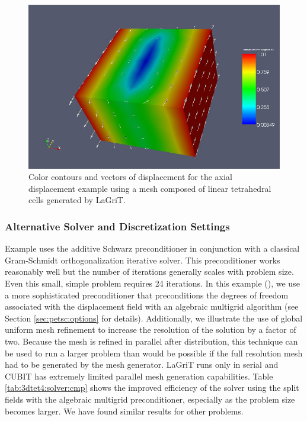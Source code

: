 \begin{figure}
  \includegraphics[scale=0.45]{examples/figs/3dtet4_shear}
  \caption{Color contours and vectors of displacement for the axial displacement
    example using a mesh composed of linear tetrahedral cells generated
    by LaGriT.}
  \label{fig:3dtet4:shear}
\end{figure}


\subsubsection{Alternative Solver and Discretization Settings}

Example  uses the additive Schwarz preconditioner
in conjunction with a classical Gram-Schmidt orthogonalization iterative
solver. This preconditioner works reasonably well but the number of
iterations generally scales with problem size. Even this small, simple
problem requires 24 iterations. In this example (),
we use a more sophisticated preconditioner that preconditions the
degrees of freedom associated with the displacement field with an
algebraic multigrid algorithm (see Section \vref{sec:petsc:options}
for details). Additionally, we illustrate the use of global uniform
mesh refinement to increase the resolution of the solution by a factor
of two. Because the mesh is refined in parallel after distribution,
this technique can be used to run a larger problem than would be possible
if the full resolution mesh had to be generated by the mesh generator.
LaGriT runs only in serial and CUBIT has extremely limited parallel
mesh generation capabilities. Table \vref{tab:3dtet4:solver:cmp} shows
the improved efficiency of the solver using the split fields with
the algebraic multigrid preconditioner, especially as the problem
size becomes larger. We have found similar results for other problems.

